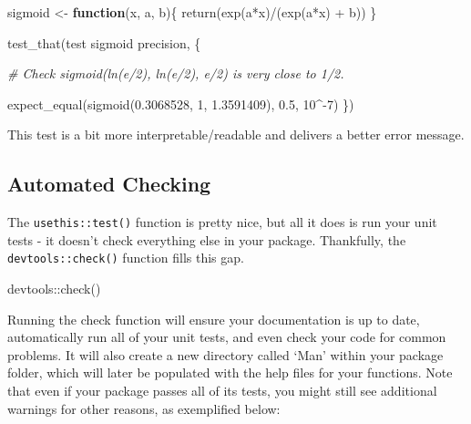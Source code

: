 \documentclass[
]{book}
\newenvironment{Shaded}{\begin{snugshade}}{\end{snugshade}}
\newcommand{\CommentTok}[1]{\textcolor[rgb]{0.56,0.35,0.01}{\textit{#1}}}
\newcommand{\ControlFlowTok}[1]{\textcolor[rgb]{0.13,0.29,0.53}{\textbf{#1}}}
\newcommand{\DecValTok}[1]{\textcolor[rgb]{0.00,0.00,0.81}{#1}}
\newcommand{\FloatTok}[1]{\textcolor[rgb]{0.00,0.00,0.81}{#1}}
\newcommand{\FunctionTok}[1]{\textcolor[rgb]{0.00,0.00,0.00}{#1}}
\newcommand{\NormalTok}[1]{#1}
\newcommand{\OtherTok}[1]{\textcolor[rgb]{0.56,0.35,0.01}{#1}}
\newcommand{\SpecialCharTok}[1]{\textcolor[rgb]{0.00,0.00,0.00}{#1}}
\newcommand{\StringTok}[1]{\textcolor[rgb]{0.31,0.60,0.02}{#1}}
\begin{document}
\begin{Shaded}
\begin{Highlighting}[]
\NormalTok{sigmoid }\OtherTok{\textless{}{-}} \ControlFlowTok{function}\NormalTok{(x, a, b)\{}
  \FunctionTok{return}\NormalTok{(}\FunctionTok{exp}\NormalTok{(a}\SpecialCharTok{*}\NormalTok{x)}\SpecialCharTok{/}\NormalTok{(}\FunctionTok{exp}\NormalTok{(a}\SpecialCharTok{*}\NormalTok{x) }\SpecialCharTok{+}\NormalTok{ b))}
\NormalTok{\}}

\FunctionTok{test\_that}\NormalTok{(}\StringTok{\textquotesingle{}test sigmoid precision\textquotesingle{}}\NormalTok{, \{}

  \CommentTok{\# Check sigmoid(ln(e/2), ln(e/2), e/2) is very close to 1/2.}

  \FunctionTok{expect\_equal}\NormalTok{(}\FunctionTok{sigmoid}\NormalTok{(}\FloatTok{0.3068528}\NormalTok{, }\DecValTok{1}\NormalTok{, }\FloatTok{1.3591409}\NormalTok{), }\FloatTok{0.5}\NormalTok{, }\DecValTok{10}\SpecialCharTok{\^{}{-}}\DecValTok{7}\NormalTok{)}
\NormalTok{\})}
\end{Highlighting}
\end{Shaded}

This test is a bit more interpretable/readable and delivers a better error message.

\hypertarget{automated-checking}{%
\subsection{Automated Checking}\label{automated-checking}}

The \texttt{usethis::test()} function is pretty nice, but all it does is run your unit tests - it doesn't check everything else in your package. Thankfully, the \texttt{devtools::check()} function fills this gap.

\begin{Shaded}
\begin{Highlighting}[]
\NormalTok{devtools}\SpecialCharTok{::}\FunctionTok{check}\NormalTok{()}
\end{Highlighting}
\end{Shaded}

Running the check function will ensure your documentation is up to date, automatically run all of your unit tests, and even check your code for common problems. It will also create a new directory called `Man' within your package folder, which will later be populated with the help files for your functions. Note that even if your package passes all of its tests, you might still see additional warnings for other reasons, as exemplified below:
\end{document}
